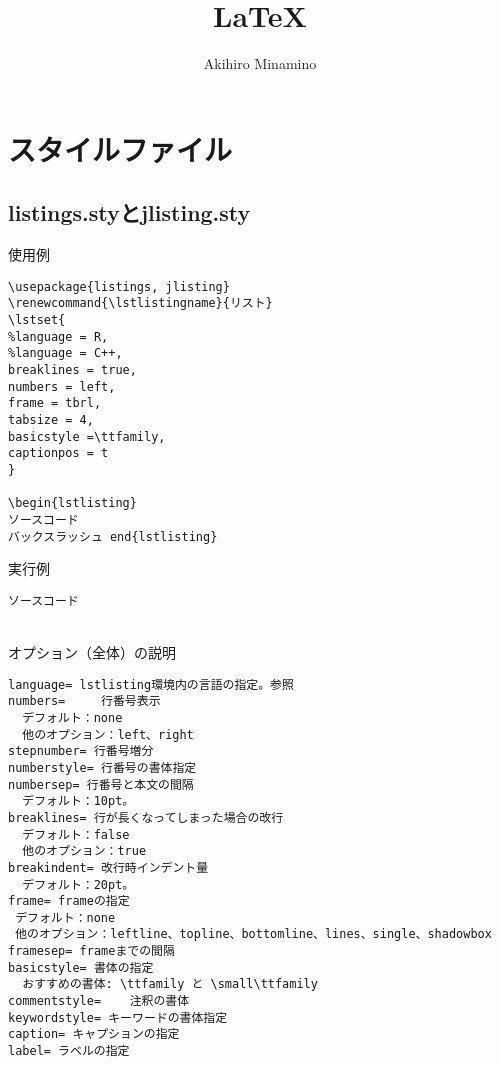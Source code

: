 \documentclass[11pt, oneside]{article}   	%
\title{\LaTeX}
\author{Akihiro Minamino}
\renewcommand{\lstlistingname}{リスト}
\begin{document}
\maketitle

\section{スタイルファイル}
\subsection{listings.styとjlisting.sty}
使用例
\begin{lstlisting}
\usepackage{listings, jlisting}
\renewcommand{\lstlistingname}{リスト}
\lstset{
%language = R,
%language = C++,   
breaklines = true,
numbers = left,
frame = tbrl,
tabsize = 4,
basicstyle =\ttfamily,
captionpos = t
}

\begin{lstlisting}
ソースコード
バックスラッシュ end{lstlisting}
\end{lstlisting} 
実行例
\begin{lstlisting}
ソースコード
\end{lstlisting}
　\\
オプション（全体）の説明
\begin{lstlisting}
language= lstlisting環境内の言語の指定。参照
numbers=	 行番号表示
  デフォルト：none
  他のオプション：left、right
stepnumber= 行番号増分
numberstyle= 行番号の書体指定
numbersep= 行番号と本文の間隔
  デフォルト：10pt。
breaklines= 行が長くなってしまった場合の改行
  デフォルト：false
  他のオプション：true
breakindent= 改行時インデント量
  デフォルト：20pt。
frame= frameの指定
 デフォルト：none
 他のオプション：leftline、topline、bottomline、lines、single、shadowbox
framesep= frameまでの間隔
basicstyle= 書体の指定
  おすすめの書体: \ttfamily と \small\ttfamily
commentstyle=	 注釈の書体
keywordstyle= キーワードの書体指定
caption= キャプションの指定
label= ラベルの指定
\end{lstlisting}
\end{document}
